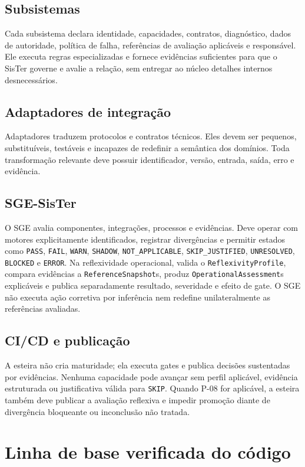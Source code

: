 \documentclass[11pt,a4paper,oneside]{article}
\begin{document}
\subsection{Subsistemas}
Cada subsistema declara identidade, capacidades, contratos, diagnóstico, dados de autoridade, política de falha, referências de avaliação aplicáveis e responsável. Ele executa regras especializadas e fornece evidências suficientes para que o SisTer governe e avalie a relação, sem entregar ao núcleo detalhes internos desnecessários.

\subsection{Adaptadores de integração}
Adaptadores traduzem protocolos e contratos técnicos. Eles devem ser pequenos, substituíveis, testáveis e incapazes de redefinir a semântica dos domínios. Toda transformação relevante deve possuir identificador, versão, entrada, saída, erro e evidência.

\subsection{SGE-SisTer}
O SGE avalia componentes, integrações, processos e evidências. Deve operar com motores explicitamente identificados, registrar divergências e permitir estados como \texttt{PASS}, \texttt{FAIL}, \texttt{WARN}, \texttt{SHADOW}, \texttt{NOT\_APPLICABLE}, \texttt{SKIP\_JUSTIFIED}, \texttt{UNRESOLVED}, \texttt{BLOCKED} e \texttt{ERROR}. Na reflexividade operacional, valida o \texttt{ReflexivityProfile}, compara evidências a \texttt{ReferenceSnapshot}s, produz \texttt{OperationalAssessment}s explicáveis e publica separadamente resultado, severidade e efeito de gate. O SGE não executa ação corretiva por inferência nem redefine unilateralmente as referências avaliadas.

\subsection{CI/CD e publicação}
A esteira não cria maturidade; ela executa gates e publica decisões sustentadas por evidências. Nenhuma capacidade pode avançar sem perfil aplicável, evidência estruturada ou justificativa válida para \texttt{SKIP}. Quando P-08 for aplicável, a esteira também deve publicar a avaliação reflexiva e impedir promoção diante de divergência bloqueante ou inconclusão não tratada.

\section{Linha de base verificada do código}
\end{document}
